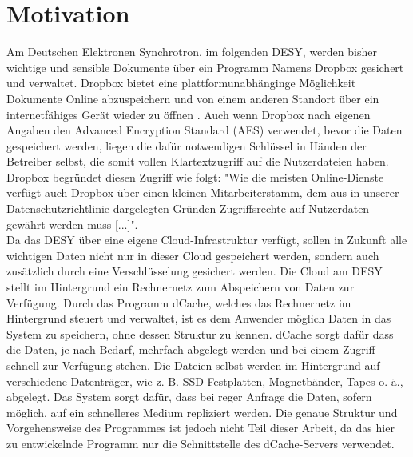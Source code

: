 \documentclass[10pt, a4paper,headsepline]{scrreprt}
\begin{document}
\section{Motivation}
Am Deutschen Elektronen Synchrotron, im folgenden DESY, werden bisher wichtige und sensible Dokumente über ein Programm Namens Dropbox gesichert und verwaltet. Dropbox bietet eine plattformunabhänginge Möglichkeit Dokumente Online abzuspeichern und von einem anderen Standort über ein internetfähiges Gerät wieder zu öffnen \cite{website:dropbox-main}. Auch wenn Dropbox nach eigenen Angaben den Advanced Encryption Standard (AES)  verwendet, bevor die Daten gespeichert werden, liegen die dafür notwendigen Schlüssel in Händen der Betreiber selbst, die somit vollen Klartextzugriff auf die Nutzerdateien haben. Dropbox begründet diesen Zugriff wie folgt:  "Wie die meisten Online-Dienste verfügt auch Dropbox über einen kleinen Mitarbeiterstamm, dem aus in unserer Datenschutzrichtlinie dargelegten Gründen Zugriffsrechte auf Nutzerdaten gewährt werden muss [...]". \cite{website:dropbox-help} \\
Da das DESY über eine eigene Cloud-Infrastruktur verfügt, sollen in Zukunft alle wichtigen Daten nicht nur in dieser Cloud gespeichert werden, sondern auch zusätzlich durch eine Verschlüsselung gesichert werden. Die Cloud am DESY stellt im Hintergrund ein Rechnernetz zum Abspeichern von Daten zur Verfügung. Durch das Programm dCache, welches das Rechnernetz im Hintergrund steuert und verwaltet, ist es dem Anwender möglich Daten in das System zu speichern, ohne dessen Struktur zu kennen. dCache sorgt dafür dass die Daten, je nach Bedarf, mehrfach abgelegt werden und bei einem Zugriff schnell zur Verfügung stehen. Die Dateien selbst werden im Hintergrund auf verschiedene Datenträger, wie z. B. SSD-Festplatten, Magnetbänder, Tapes o. ä., abgelegt. Das System sorgt dafür, dass bei reger Anfrage die Daten, sofern möglich, auf ein schnelleres Medium repliziert werden. Die genaue Struktur und Vorgehensweise des Programmes ist jedoch nicht Teil dieser Arbeit, da das hier zu entwickelnde Programm nur die Schnittstelle des dCache-Servers verwendet.
\end{document}
